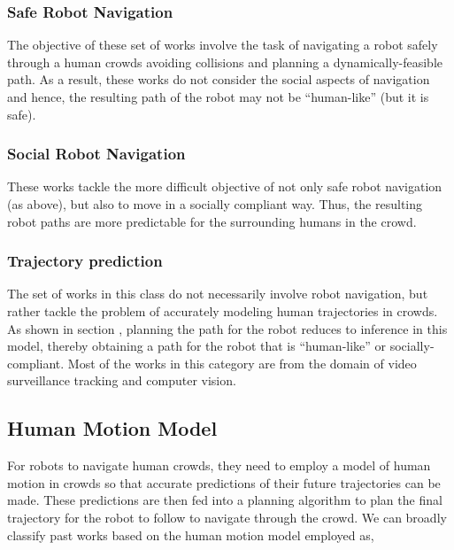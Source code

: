 \subsubsection{Safe Robot Navigation}
\label{sec:survey-safe-robot-navig}

The objective of these set of works involve the task of navigating a robot safely through a human crowds avoiding collisions and planning a dynamically-feasible path. As a result, these works do not consider the social aspects of navigation and hence, the resulting path of the robot may not be ``human-like'' (but it is safe).

\subsubsection{Social Robot Navigation}
\label{sec:survey-soci-robot-navig}

These works tackle the more difficult objective of not only safe robot navigation (as above), but also to move in a socially compliant way. Thus, the resulting robot paths are more predictable for the surrounding humans in the crowd.

\subsubsection{Trajectory prediction}
\label{sec:survey-traj-pred}

The set of works in this class do not necessarily involve robot navigation, but rather tackle the problem of accurately modeling human trajectories in crowds. As shown in section , planning the path for the robot reduces to inference in this model, thereby obtaining a path for the robot that is ``human-like'' or socially-compliant. Most of the works in this category are from the domain of video surveillance tracking and computer vision.



\subsection{Human Motion Model}
\label{sec:survey-human-motion-model}

For robots to navigate human crowds, they need to employ a model of human motion in crowds so that accurate predictions of their future trajectories can be made. These predictions are then fed into a planning algorithm to plan the final trajectory for the robot to follow to navigate through the crowd. We can broadly classify past works based on the human motion model employed as,

